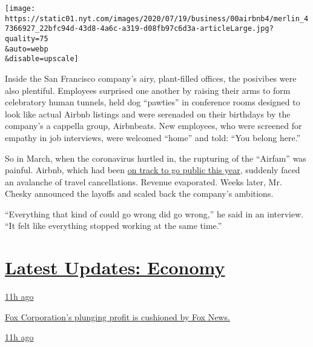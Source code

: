 \texttt{[image: https://static01.nyt.com/images/2020/07/19/business/00airbnb4/merlin\_47366927\_22bfc94d-43d8-4a6c-a319-d08fb97c6d3a-articleLarge.jpg?quality=75\\\&auto=webp\\\&disable=upscale]}

Inside the San Francisco company's airy, plant-filled offices, the
posivibes were also plentiful. Employees surprised one another by
raising their arms to form celebratory human tunnels, held dog
``pawties'' in conference rooms designed to look like actual Airbnb
listings and were serenaded on their birthdays by the company's a
cappella group, Airbnbeats. New employees, who were screened for empathy
in job interviews, were welcomed ``home'' and told: ``You belong here.''

So in March, when the coronavirus hurtled in, the rupturing of the
``Airfam'' was painful. Airbnb, which had been
\href{https://www.nytimes.com/2019/09/19/technology/airbnb-ipo-2020.html}{on
track to go public this year}, suddenly faced an avalanche of travel
cancellations. Revenue evaporated. Weeks later, Mr. Chesky announced the
layoffs and scaled back the company's ambitions.

``Everything that kind of could go wrong did go wrong,'' he said in an
interview. ``It felt like everything stopped working at the same time.''

\hypertarget{latest-updates-economy}{%
\section{\texorpdfstring{\href{https://www.nytimes.com/live/2020/08/04/business/stock-market-today-coronavirus?action=click\&pgtype=Article\&state=default\&region=MAIN_CONTENT_1\&context=storylines_live_updates}{Latest
Updates:
Economy}}{Latest Updates: Economy}}\label{latest-updates-economy}}

\href{https://www.nytimes.com/live/2020/08/04/business/stock-market-today-coronavirus?action=click\&pgtype=Article\&state=default\&region=MAIN_CONTENT_1\&context=storylines_live_updates\#fox-corporations-plunging-profit-is-cushioned-by-fox-news}{11h
ago}

\href{https://www.nytimes.com/live/2020/08/04/business/stock-market-today-coronavirus?action=click\&pgtype=Article\&state=default\&region=MAIN_CONTENT_1\&context=storylines_live_updates\#fox-corporations-plunging-profit-is-cushioned-by-fox-news}{Fox
Corporation's plunging profit is cushioned by Fox News.}

\href{https://www.nytimes.com/live/2020/08/04/business/stock-market-today-coronavirus?action=click\&pgtype=Article\&state=default\&region=MAIN_CONTENT_1\&context=storylines_live_updates\#trading-in-kodak-shares-comes-under-scrutiny}{11h
ago}

